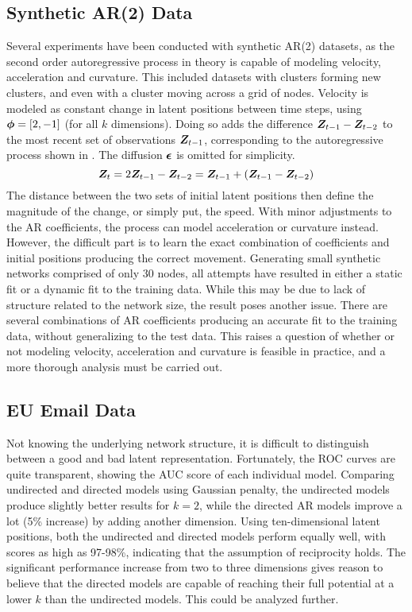 \subsection{Synthetic AR(2) Data}

    Several experiments have been conducted with synthetic AR(2) datasets, as the second order autoregressive process in theory is capable of modeling velocity, acceleration and curvature. This included datasets with clusters forming new clusters, and even with a cluster moving across a grid of nodes. 
    Velocity is modeled as constant change in latent positions between time steps, using $\bm{\phi}=[2,-1]$ (for all $k$ dimensions). Doing so adds the difference $\bm{Z}_{t-1} - \bm{Z}_{t-2}$ to the most recent set of observations $\bm{Z}_{t-1}$, corresponding to the autoregressive process shown in . The diffusion $\bm{\epsilon}$ is omitted for simplicity.
    \begin{equation}\label{eq:data-velocity}
        \bm{Z}_t = 2 \bm{Z}_{t-1} - \bm{Z}_{t-2} = \bm{Z}_{t-1} + (\bm{Z}_{t-1} - \bm{Z}_{t-2})
    \end{equation}
    The distance between the two sets of initial latent positions then define the magnitude of the change, or simply put, the speed. With minor adjustments to the AR coefficients, the process can model acceleration or curvature instead. However, the difficult part is to learn the exact combination of coefficients and initial positions producing the correct movement. Generating small synthetic networks comprised of only 30 nodes, all attempts have resulted in either a static fit or a dynamic fit to the training data. While this may be due to lack of structure related to the network size, the result poses another issue. There are several combinations of AR coefficients producing an accurate fit to the training data, without generalizing to the test data. 
    This raises a question of whether or not modeling velocity, acceleration and curvature is feasible in practice, and a more thorough analysis must be carried out.

\subsection{EU Email Data}

    Not knowing the underlying network structure, it is difficult to distinguish between a good and bad latent representation. Fortunately, the ROC curves are quite transparent, showing the AUC score of each individual model. Comparing undirected and directed models using Gaussian penalty, the undirected models produce slightly better results for $k=2$, while the directed AR models improve a lot (5\% increase) by adding another dimension. Using ten-dimensional latent positions, both the undirected and directed models perform equally well, with scores as high as 97-98\%, indicating that the assumption of reciprocity holds. The significant performance increase from two to three dimensions gives reason to believe that the directed models are capable of reaching their full potential at a lower $k$ than the undirected models. This could be analyzed further.
    
